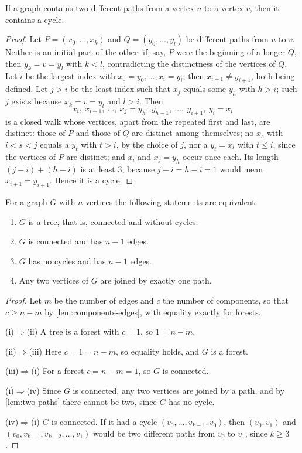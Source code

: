 \begin{lemma}
\label{lem:two-paths}
If a graph contains two different paths from a vertex $u$ to a vertex $v$, then it contains a cycle.
\end{lemma}

\begin{proof}
Let $P=(x_0,\ldots,x_k)$ and $Q=(y_0,\ldots,y_l)$ be different paths from $u$ to $v$. Neither is an initial part of the other: if, say, $P$ were the beginning of a longer $Q$, then $y_k=v=y_l$ with $k<l$, contradicting the distinctness of the vertices of $Q$. Let $i$ be the largest index with $x_0=y_0,\ldots,x_i=y_i$; then $x_{i+1}\ne y_{i+1}$, both being defined. Let $j>i$ be the least index such that $x_j$ equals some $y_h$ with $h>i$; such $j$ exists because $x_k=v=y_l$ and $l>i$. Then
\[
x_i,\ x_{i+1},\ \ldots,\ x_j=y_h,\ y_{h-1},\ \ldots,\ y_{i+1},\ y_i=x_i
\]
is a closed walk whose vertices, apart from the repeated first and last, are distinct: those of $P$ and those of $Q$ are distinct among themselves; no $x_s$ with $i<s<j$ equals a $y_t$ with $t>i$, by the choice of $j$, nor a $y_t=x_t$ with $t\le i$, since the vertices of $P$ are distinct; and $x_i$ and $x_j=y_h$ occur once each. Its length $(j-i)+(h-i)$ is at least $3$, because $j-i=h-i=1$ would mean $x_{i+1}=y_{i+1}$. Hence it is a cycle.
\end{proof}

\begin{theorem}
\label{thm:tree}
For a graph $G$ with $n$ vertices the following statements are equivalent.
\begin{enumerate}
\item $G$ is a tree, that is, connected and without cycles.
\item $G$ is connected and has $n-1$ edges.
\item $G$ has no cycles and has $n-1$ edges.
\item Any two vertices of $G$ are joined by exactly one path.
\end{enumerate}
\end{theorem}

\begin{proof}
Let $m$ be the number of edges and $c$ the number of components, so that $c\ge n-m$ by \cref{lem:components-edges}, with equality exactly for forests.

(i)$\Rightarrow$(ii) A tree is a forest with $c=1$, so $1=n-m$.

(ii)$\Rightarrow$(iii) Here $c=1=n-m$, so equality holds, and $G$ is a forest.

(iii)$\Rightarrow$(i) For a forest $c=n-m=1$, so $G$ is connected.

(i)$\Rightarrow$(iv) Since $G$ is connected, any two vertices are joined by a path, and by \cref{lem:two-paths} there cannot be two, since $G$ has no cycle.

(iv)$\Rightarrow$(i) $G$ is connected. If it had a cycle $(v_0,\ldots,v_{k-1},v_0)$, then $(v_0,v_1)$ and $(v_0,v_{k-1},v_{k-2},\ldots,v_1)$ would be two different paths from $v_0$ to $v_1$, since $k\ge3$.
\end{proof}

